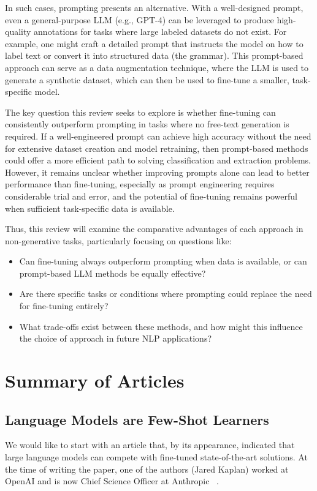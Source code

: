 \documentclass[11pt]{article}
\begin{document}
In such cases, prompting presents an alternative. With a well-designed prompt, even a general-purpose LLM (e.g., GPT-4) can be leveraged to produce high-quality annotations for tasks where large labeled datasets do not exist. For example, one might craft a detailed prompt that instructs the model on how to label text or convert it into structured data (the grammar). This prompt-based approach can serve as a data augmentation technique, where the LLM is used to generate a synthetic dataset, which can then be used to fine-tune a smaller, task-specific model.

The key question this review seeks to explore is whether fine-tuning can consistently outperform prompting in tasks where no free-text generation is required. If a well-engineered prompt can achieve high accuracy without the need for extensive dataset creation and model retraining, then prompt-based methods could offer a more efficient path to solving classification and extraction problems. However, it remains unclear whether improving prompts alone can lead to better performance than fine-tuning, especially as prompt engineering requires considerable trial and error, and the potential of fine-tuning remains powerful when sufficient task-specific data is available.

Thus, this review will examine the comparative advantages of each approach in non-generative tasks, particularly focusing on questions like:

\begin{itemize}
    \item Can fine-tuning always outperform prompting when data is available, or can prompt-based LLM methods be equally effective?
    \item Are there specific tasks or conditions where prompting could replace the need for fine-tuning entirely?
    \item What trade-offs exist between these methods, and how might this influence the choice of approach in future NLP applications?
\end{itemize}

\section{Summary of Articles}

\subsection{Language Models are Few-Shot Learners}
We would like to start with an article that, by its appearance, indicated that large language models can compete with fine-tuned state-of-the-art solutions. At the time of writing the paper, one of the authors (Jared Kaplan) worked at OpenAI and is now Chief Science Officer at Anthropic ~\cite{LMFSL:2020}.
\end{document}

